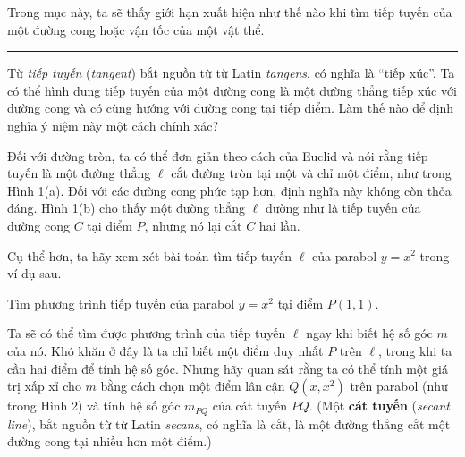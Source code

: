 \begin{minipage}[t]{133.9mm}
  \vspace{0pt}
  \setlength{\parindent}{12pt}
  \setlength{\parskip}{2.5pt}
  \setlength{\abovedisplayskip}{5pt}
  \setlength{\belowdisplayskip}{5pt}

  \noindent Trong mục này, ta sẽ thấy giới hạn xuất hiện như thế nào khi tìm tiếp tuyến của một đường cong hoặc vận tốc của một vật thể.

  \vspace{6pt}
  \noindent\textcolor{stewartblue}{\rule{1.1ex}{1.1ex}}\hspace{0.5em}{\large\bfseries\sffamily Bài toán tiếp tuyến}\par
  \vspace{2pt}
  \noindent Từ \emph{tiếp tuyến} (\emph{tangent}) bắt nguồn từ từ Latin \emph{tangens}, có nghĩa là “tiếp xúc”. Ta có thể hình dung tiếp tuyến của một đường cong là một đường thẳng tiếp xúc với đường cong và có cùng hướng với đường cong tại tiếp điểm. Làm thế nào để định nghĩa ý niệm này một cách chính xác?

  Đối với đường tròn, ta có thể đơn giản theo cách của Euclid và nói rằng tiếp tuyến là một đường thẳng $\ell$ cắt đường tròn tại một và chỉ một điểm, như trong Hình 1(a). Đối với các đường cong phức tạp hơn, định nghĩa này không còn thỏa đáng. Hình 1(b) cho thấy một đường thẳng $\ell$ dường như là tiếp tuyến của đường cong $C$ tại điểm $P$, nhưng nó lại cắt $C$ hai lần.

  Cụ thể hơn, ta hãy xem xét bài toán tìm tiếp tuyến $\ell$ của parabol $y = x^2$ trong ví dụ sau.

  \vspace{6pt}
  \hspace{0.8em}Tìm phương trình tiếp tuyến của parabol $y = x^2$ tại điểm $P(1, 1)$.\par
  \vspace{3pt}
  \hspace{0.8em}Ta sẽ có thể tìm được phương trình của tiếp tuyến $\ell$ ngay khi biết hệ số góc $m$ của nó. Khó khăn ở đây là ta chỉ biết một điểm duy nhất $P$ trên $\ell$, trong khi ta cần hai điểm để tính hệ số góc. Nhưng hãy quan sát rằng ta có thể tính một giá trị xấp xỉ cho $m$ bằng cách chọn một điểm lân cận $Q(x, x^2)$ trên parabol (như trong Hình 2) và tính hệ số góc $m_{PQ}$ của cát tuyến $PQ$. (Một \textbf{cát tuyến} (\emph{secant line}), bắt nguồn từ từ Latin \emph{secans}, có nghĩa là cắt, là một đường thẳng cắt một đường cong tại nhiều hơn một điểm.)


\end{minipage}
